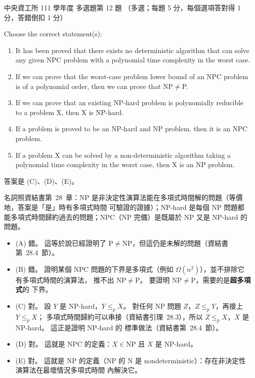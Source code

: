 \begin{pastexam}[label={px:ncu-111-dsa-12}]{中央資工所 111 學年度 多選題第 12 題}
（多選；每題 5 分，每個選項答對得 1 分，答錯倒扣 1 分）

Choose the correct statement(s):
\begin{enumerate}[label=(\Alph*)]
\item It has been proved that there exists no deterministic algorithm that can solve any given NPC
problem with a polynomial time complexity in the worst case.
\item If we can prove that the worst-case problem lower bound of an NPC problem is of a polynomial
order, then we can prove that NP$\neq$P.
\item If we can prove that an existing NP-hard problem is polynomially reducible to a problem X,
then X is NP-hard.
\item If a problem is proved to be an NP-hard and NP problem, then it is an NPC problem.
\item If a problem X can be solved by a non-deterministic algorithm taking a polynomial time
complexity in the worst case, then X is an NP problem.
\end{enumerate}
\end{pastexam}

\begin{pastsoln}
答案是 (C)、(D)、(E)。

名詞照資結書第~28~章：NP 是非決定性演算法能在多項式時間解的問題（等價地，答案是「是」時有多項式時間
可驗證的證據）；NP-hard 是每個 NP 問題都能多項式時間歸約過去的問題；NPC（NP 完備）是既屬於 NP 又是
NP-hard 的問題。
\begin{itemize}
\item (A) 錯。 這等於說已經證明了 $\mathrm{P} \ne \mathrm{NP}$，但這仍是未解的問題（資結書第~28.4~節）。
\item (B) 錯。 證明某個 NPC 問題的下界是多項式（例如 $\Omega(n^2)$），並不排除它有多項式時間的演算法，
推不出 $\mathrm{NP} \ne \mathrm{P}$。 要證明 $\mathrm{NP} \ne \mathrm{P}$，需要的是\textbf{超多項式}的
下界。
\item (C) 對。 設 $Y$ 是 NP-hard，$Y \le_p X$。 對任何 NP 問題 $Z$，$Z \le_p Y$，再接上 $Y \le_p X$；
多項式時間歸約可以串接（資結書引理~28.3），所以 $Z \le_p X$，$X$ 是 NP-hard。 這正是證明 NP-hard 的
標準做法（資結書第~28.4~節）。
\item (D) 對。 這就是 NPC 的定義：$X \in \mathrm{NP}$ 且 $X$ 是 NP-hard。
\item (E) 對。 這就是 NP 的定義（NP 的 N 是 nondeterministic）：存在非決定性演算法在最壞情況多項式時間
內解決它。
\end{itemize}
\end{pastsoln}
